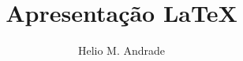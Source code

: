 \documentclass[14pt]{beamer}
\begin{document}
	\author{Helio M. Andrade}
	\title{Apresentação LaTeX}
	\begin{frame}[plain]
	\maketitle
\end{frame}

\begin{frame}
\frametitle{}
\end{frame}
\end{document}
